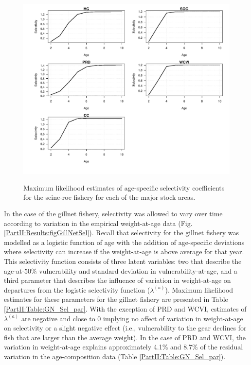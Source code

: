 \begin{figure}[!tbp]
	\includegraphics[width=\textwidth]{../FIGS/qPriorFigs/iscam_fig_sel2d_seine_roe_sel.pdf}\\
	\caption{Maximum likelihood estimates of age-specific selectivity coefficients for the seine-roe fishery for each of the major stock areas.}\label{PartII:Results:figSeineRoeSel}
\end{figure}

In the case of the gillnet fishery, selectivity was allowed to vary over time according to variation in the empirical weight-at-age data (Fig. \ref{PartII:Results:figGillNetSel}).  Recall that selectivity for the gillnet fishery was modelled as a logistic function of age with the addition of age-specific deviations where selectivity can increase if the weight-at-age is above average for that year.  This selectivity function consists of three latent variables: two that describe the age-at-50\% vulnerability and standard deviation in vulnerability-at-age, and a third parameter that describes the influence of variation in weight-at-age on departures from the logistic selectivity function ($\lambda^{(a)}$).  Maximum likelihood estimates for these parameters for the gillnet fishery are presented in Table \ref{PartII:Table:GN_Sel_par}.  With the exception of PRD and WCVI, estimates of $\lambda^{(a)}$ are negative and close to 0 implying no affect of variation in weight-at-age on selectivity or a slight negative effect (i.e., vulnerability to the gear declines for fish that are larger than the average weight).  In the case of PRD and WCVI, the variation in weight-at-age explains approximately 4.1\% and 8.7\% of the residual variation in the age-composition data (Table \ref{PartII:Table:GN_Sel_par}).

